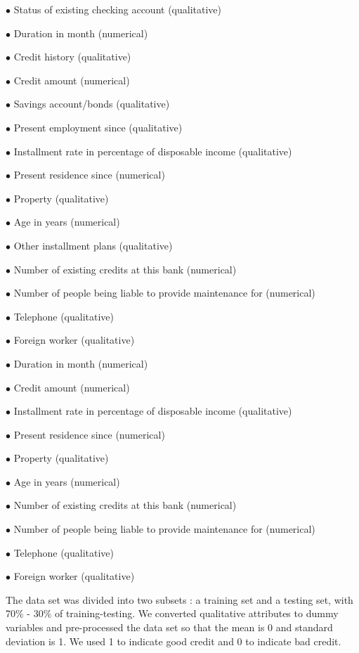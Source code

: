 \documentclass[11pt, oneside]{article}   	%
\begin{document}
\vspace{6pt}

\vspace{6pt}

$\bullet$ Status of existing checking account (qualitative)\par
$\bullet$ Duration in month (numerical)\par
$\bullet$ Credit history (qualitative)\par
$\bullet$ Credit amount (numerical)\par
$\bullet$ Savings account/bonds (qualitative)\par
$\bullet$ Present employment since (qualitative)\par
$\bullet$ Installment rate in percentage of disposable income (qualitative)\par
$\bullet$ Present residence since (numerical)\par
$\bullet$ Property (qualitative)\par
$\bullet$ Age in years (numerical)\par
$\bullet$ Other installment plans (qualitative)\par
$\bullet$ Number of existing credits at this bank (numerical)\par
$\bullet$ Number of people being liable to provide maintenance for (numerical)\par
$\bullet$ Telephone (qualitative)\par
$\bullet$ Foreign worker (qualitative)\par
\vspace{6pt}

$\bullet$ Duration in month (numerical)\par
$\bullet$ Credit amount (numerical)\par
$\bullet$ Installment rate in percentage of disposable income (qualitative)\par
$\bullet$ Present residence since (numerical)\par
$\bullet$ Property (qualitative)\par
$\bullet$ Age in years (numerical)\par
$\bullet$ Number of existing credits at this bank (numerical)\par
$\bullet$ Number of people being liable to provide maintenance for (numerical)\par
$\bullet$ Telephone (qualitative)\par
$\bullet$ Foreign worker (qualitative)\par
\vspace{6pt}
The data set was divided into two subsets : a training set and a testing set, with 70\% - 30\% of training-testing.  We converted qualitative attributes to dummy variables and  pre-processed the data set so that the mean is 0 and standard deviation is 1. We used 1 to indicate good credit and 0 to indicate bad credit.
\end{document}
